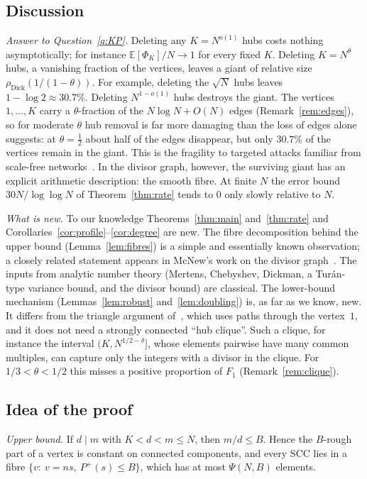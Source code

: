 \documentclass[11pt]{amsart}
\theoremstyle{definition}
\newcommand{\dick}{\rho_{\mathrm{Dick}}}
\newcommand{\E}{\mathbb{E}}
\newcommand{\Pp}{P^{+}}
\begin{document}
\subsection{Discussion}
\emph{Answer to Question~\ref{q:KP}.} Deleting any $K=N^{o(1)}$ hubs costs nothing asymptotically; for instance $\E[\Phi_K]/N\to1$ for every fixed $K$. Deleting $K=N^{\theta}$ hubs, a vanishing fraction of the vertices, leaves a giant of relative size $\dick(1/(1-\theta))$. For example, deleting the $\sqrt N$ hubs leaves $1-\log2\approx30.7\%$. Deleting $N^{1-o(1)}$ hubs destroys the giant. The vertices $1,\dots,K$ carry a $\theta$-fraction of the $N\log N+O(N)$ edges (Remark~\ref{rem:edges}), so for moderate $\theta$ hub removal is far more damaging than the loss of edges alone suggests: at $\theta=\frac12$ about half of the edges disappear, but only $30.7\%$ of the vertices remain in the giant. This is the fragility to targeted attacks familiar from scale-free networks~\cite{AJB,BR}. In the divisor graph, however, the surviving giant has an explicit arithmetic description: the smooth fibre. At finite $N$ the error bound $30N/\log\log N$ of Theorem~\ref{thm:rate} tends to $0$ only slowly relative to $N$.

\emph{What is new.} To our knowledge Theorems~\ref{thm:main} and~\ref{thm:rate} and Corollaries~\ref{cor:profile}--\ref{cor:degree} are new. The fibre decomposition behind the upper bound (Lemma~\ref{lem:fibres}) is a simple and essentially known observation; a closely related statement appears in McNew's work on the divisor graph~\cite{McN}. The inputs from analytic number theory (Mertens, Chebyshev, Dickman, a Tur\'an-type variance bound, and the divisor bound) are classical. The lower-bound mechanism (Lemmas~\ref{lem:robust} and~\ref{lem:doubling}) is, as far as we know, new. It differs from the triangle argument of~\cite{KP}, which uses paths through the vertex~$1$, and it does not need a strongly connected ``hub clique''. Such a clique, for instance the interval $(K,N^{1/2-\delta}]$, whose elements pairwise have many common multiples, can capture only the integers with a divisor in the clique. For $1/3<\theta<1/2$ this misses a positive proportion of $F_1$ (Remark~\ref{rem:clique}).

\subsection{Idea of the proof}
\emph{Upper bound.} If $d\mid m$ with $K<d<m\le N$, then $m/d\le B$. Hence the $B$-rough part of a vertex is constant on connected components, and every SCC lies in a fibre $\{v:\ v=n s,\ \Pp(s)\le B\}$, which has at most $\Psi(N,B)$ elements.
\end{document}
